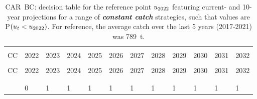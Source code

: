 \documentclass[11pt]{book}
\newcommand{\itbf}[1]{\textit{\textbf{#1}}}
\begin{document}
\begin{longtable}[c]{>{\raggedright\let\newline\\\arraybackslash\hspace{0pt}}p{0.49in}>{\raggedleft\let\newline\\\arraybackslash\hspace{0pt}}p{0.49in}>{\raggedleft\let\newline\\\arraybackslash\hspace{0pt}}p{0.49in}>{\raggedleft\let\newline\\\arraybackslash\hspace{0pt}}p{0.49in}>{\raggedleft\let\newline\\\arraybackslash\hspace{0pt}}p{0.54in}>{\raggedleft\let\newline\\\arraybackslash\hspace{0pt}}p{0.54in}>{\raggedleft\let\newline\\\arraybackslash\hspace{0pt}}p{0.49in}>{\raggedleft\let\newline\\\arraybackslash\hspace{0pt}}p{0.54in}>{\raggedleft\let\newline\\\arraybackslash\hspace{0pt}}p{0.54in}>{\raggedleft\let\newline\\\arraybackslash\hspace{0pt}}p{0.54in}>{\raggedleft\let\newline\\\arraybackslash\hspace{0pt}}p{0.54in}>{\raggedleft\let\newline\\\arraybackslash\hspace{0pt}}p{0.54in}}
  \caption{CAR~BC: decision table for the reference point $u_{2022}$ featuring current- and 10-year projections for a range of \itbf{constant catch} strategies, such that values are P$(u_t < u_{2022})$.  For reference, the average catch over the last 5 years (2017-2021) was 789~t. } \label{tab:car.gmu.ucurr.CCs}\\  \hline\\[-2.2ex]  CC  & 2022 & 2023 & 2024 & 2025 & 2026 & 2027 & 2028 & 2029 & 2030 & 2031 & 2032 \\[0.2ex]\hline\\[-1.5ex]  \endfirsthead   \hline  CC  & 2022 & 2023 & 2024 & 2025 & 2026 & 2027 & 2028 & 2029 & 2030 & 2031 & 2032 \\[0.2ex]\hline\\[-1.5ex]  \endhead  \hline\\[-2.2ex]   \endfoot  \hline \endlastfoot  0 & 0 & 1 & 1 & 1 & 1 & 1 & 1 & 1 & 1 & 1 & 1 \\ 

\end{longtable}
\end{document}
